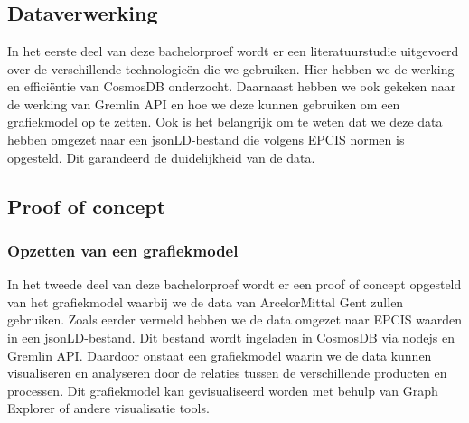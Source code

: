 
\chapter{}%
\label{ch:methodologie}
\section{Dataverwerking}
In het eerste deel van deze bachelorproef wordt er een literatuurstudie uitgevoerd over de verschillende technologieën die we gebruiken.
Hier hebben we de werking en efficiëntie van CosmosDB onderzocht. Daarnaast hebben we ook gekeken naar de werking van Gremlin API en hoe we deze kunnen gebruiken om een grafiekmodel op te zetten.
Ook is het belangrijk om te weten dat we deze data hebben omgezet naar een jsonLD-bestand die volgens EPCIS normen is opgesteld. Dit garandeerd de duidelijkheid van de data.

\section{Proof of concept}
\subsection{Opzetten van een grafiekmodel}
In het tweede deel van deze bachelorproef wordt er een proof of concept opgesteld van het grafiekmodel waarbij we de data van ArcelorMittal Gent zullen gebruiken.
Zoals eerder vermeld hebben we de data omgezet naar EPCIS waarden in een jsonLD-bestand. Dit bestand wordt ingeladen in CosmosDB via nodejs en Gremlin API.\@
Daardoor onstaat een grafiekmodel waarin we de data kunnen visualiseren en analyseren door de relaties tussen de verschillende producten en processen.
Dit grafiekmodel kan gevisualiseerd worden met behulp van Graph Explorer of andere visualisatie tools.

